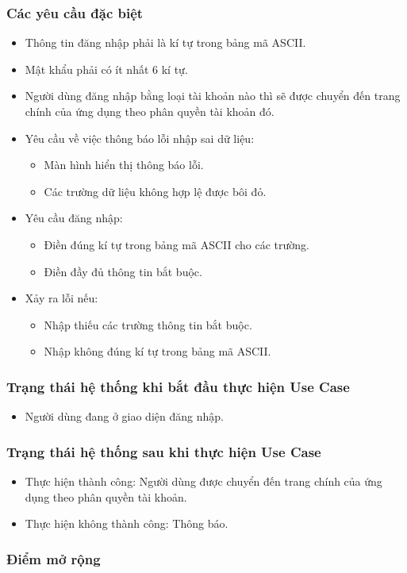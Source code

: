 \subsubsection{Các yêu cầu đặc biệt}
\begin{itemize}
    \item Thông tin đăng nhập phải là kí tự trong bảng mã ASCII.
    \item Mật khẩu phải có ít nhất 6 kí tự.
    \item Người dùng đăng nhập bằng loại tài khoản nào thì sẽ được chuyển đến trang chính của ứng dụng theo phân quyền tài khoản đó.
    \item Yêu cầu về việc thông báo lỗi nhập sai dữ liệu:
    \begin{itemize}
        \item Màn hình hiển thị thông báo lỗi.
        \item Các trường dữ liệu không hợp lệ được bôi đỏ.
    \end{itemize}
    \item Yêu cầu đăng nhập:
    \begin{itemize}
        \item Điền đúng kí tự trong bảng mã ASCII cho các trường.
        \item Điền đầy đủ thông tin bắt buộc.
    \end{itemize}
    \item Xảy ra lỗi nếu:
    \begin{itemize}
        \item Nhập thiếu các trường thông tin bắt buộc.
        \item Nhập không đúng kí tự trong bảng mã ASCII.
    \end{itemize}
\end{itemize}

\subsubsection{Trạng thái hệ thống khi bắt đầu thực hiện Use Case}
\begin{itemize}
    \item Người dùng đang ở giao diện đăng nhập.
\end{itemize}

\subsubsection{Trạng thái hệ thống sau khi thực hiện Use Case}
\begin{itemize}
    \item Thực hiện thành công: Người dùng được chuyển đến trang chính của ứng dụng theo phân quyền tài khoản.
    \item Thực hiện không thành công: Thông báo.
\end{itemize}

\subsubsection{Điểm mở rộng}
